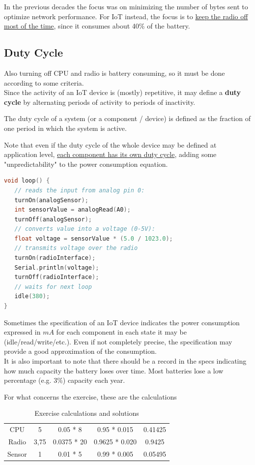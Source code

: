In the previous decades the focus was on minimizing the number of bytes sent to optimize network performance.
For IoT instead, the focus is to \ul{keep the radio off most of the time}, since it consumes about 40\% of the battery.

\subsection{Duty Cycle}
Also turning off CPU and radio is battery consuming, so it must be done according to some criteria.\\
Since the activity of an IoT device is (mostly) repetitive, it may define a \textbf{duty cycle} by alternating periods of activity to periods of inactivity.
\begin{paracol}{2}
   
   The duty cycle of a system (or a component / device) is defined as the fraction of one period in which the system is active.

   Note that even if the duty cycle of the whole device may be defined at application level, \ul{each component has its own duty cycle}, adding some "unpredictability" to the power consumption equation. 
   \switchcolumn

   \begin{lstlisting}[language=C,otherkeywords = {turnOn,turnOff,idle,Serial}]
void loop() {
   // reads the input from analog pin 0:
   turnOn(analogSensor);
   int sensorValue = analogRead(A0);
   turnOff(analogSensor);
   // converts value into a voltage (0-5V):
   float voltage = sensorValue * (5.0 / 1023.0);
   // transmits voltage over the radio
   turnOn(radioInterface);
   Serial.println(voltage);
   turnOff(radioInterface);
   // waits for next loop
   idle(380);
}
   \end{lstlisting}
   
\end{paracol}


Sometimes the specification of an IoT device indicates the power consumption expressed in $mA$ for each component in each state it may be (idle/read/write/etc.).
Even if not completely precise, the specification may provide a good approximation of the consumption.\\
It is also important to note that there should be a record in the specs indicating how much capacity the battery loses over time. Most batteries lose a low percentage (e.g. 3\%) capacity each year.

   For what concerns the exercise, these are the calculations
   \begin{table}[htbp]
      \centering
      \begin{tabular}{|c|c|c|c|c|}
         CPU & 5 &				0.05 * 8 	& 0.95 * 0.015	&	 0.41425\\
         Radio & 3,75 &		0.0375 * 20 	& 0.9625 * 0.020 &	 0.9425\\
         Sensor & 1 &			0.01 * 5		& 	0.99 * 0.005	&	 0.05495\\
      \end{tabular}
      \caption{Exercise calculations and solutions}
      \label{tab:battery_consumption}
   \end{table}
